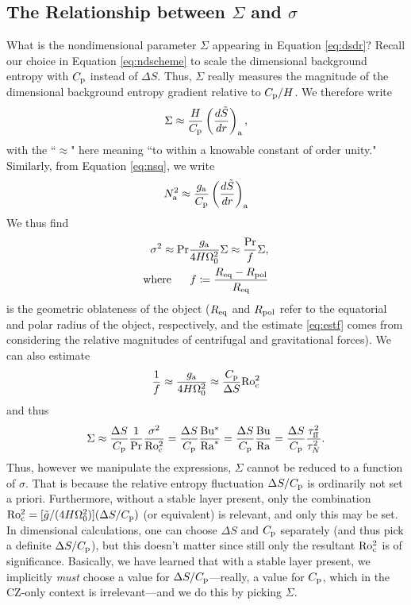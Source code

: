 \documentclass[12pt]{article}
\numberwithin{equation}{section}
\newcommand{\ga}{g_{\rm a}}
\newcommand{\nsqa}{N^2_{\rm a}}
\begin{document}
\subsection{The Relationship between $\Sigma$ and $\sigma$}
What is the nondimensional parameter $\Sigma$ appearing in Equation \eqref{eq:dsdr}? Recall our choice in Equation \eqref{eq:ndscheme} to scale the dimensional background entropy with $C_{\rm{p}}$ instead of $\Delta S$. Thus, $\Sigma$ really measures the magnitude of the dimensional background entropy gradient relative to $C_{\rm{p}}/H$. We therefore write
\begin{align}
	\Sigma \approx \frac{H}{C_{\rm{p}}} \left(\frac{d\tilde{S}}{dr}\right)_{\rm a},
\end{align}
with the ``$\approx$" here meaning ``to within a knowable constant of order unity." Similarly, from Equation \eqref{eq:nsq}, we write
\begin{align}
	\nsqa \approx \frac{\ga}{\cpcap}\left(\dsdrtilde\right)_{\rm a}
\end{align} 
We thus find
\begin{subequations}
\begin{align}
	\sigma^2\approx \pr \frac{\ga}{4H\omnought^2}\Sigma\approx \frac{\pr}{f}\Sigma\label{eq:estf},\\
	\where f\define \frac{R_{\rm eq} - R_{\rm pol}}{R_{\rm eq}}
\end{align}
\end{subequations}
is the geometric oblateness of the object ($R_{\rm eq}$ and $R_{\rm pol}$ refer to the equatorial and polar radius of the object, respectively, and the estimate \eqref{eq:estf} comes from considering the relative magnitudes of centrifugal and gravitational forces). We can also estimate
\begin{align}
	\frac{1}{f} \approx \frac{\ga}{4H\omnought^2}\approx \frac{\cpcap}{\Delta S}\rocsq
\end{align}
and thus
\begin{align}
	\Sigma \approx \frac{\Delta S}{C_{\rm{p}}} \frac{1}{{\rm{Pr}}}\frac{\sigma^2}{{\rm{Ro_c^2}}} = \frac{\Delta S}{C_{\rm{p}}} \frac{{\rm{Bu^*}}}{{\rm{Ra}}^*} = \frac{\Delta S}{C_{\rm{p}}} \frac{{\rm{Bu}}}{{\rm{Ra}}} = \frac{\Delta S}{C_{\rm{p}}} \frac{\tau_{\rm ff}^2}{\tau_N^2}. 
\end{align}
Thus, however we manipulate the expressions, $\Sigma$ cannot be reduced to a function of $\sigma$. That is because the relative entropy fluctuation $\Delta S/C_{\rm{p}}$ is ordinarily not set a priori. Furthermore, without a stable layer present, only the combination ${\rm{Ro_c^2}}=[\tilde{g}/(4H\Omega_0^2)](\Delta S/C_{\rm{p}})$ (or equivalent) is relevant, and only this may be set. In dimensional calculations, one can choose $\Delta S$ and $C_{\rm{p}}$ separately (and thus pick a definite $\Delta S/C_{\rm{p}}$), but this doesn't matter since still only the resultant ${\rm{Ro_c^2}}$ is of significance. Basically, we have learned that with a stable layer present, we implicitly \textit{must} choose a value for $\Delta S/C_{\rm{p}}$---really, a value for $C_{\rm{p}}$, which in the CZ-only context is irrelevant---and we do this by picking $\Sigma$.
\end{document}
